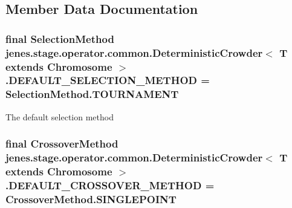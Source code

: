 \subsection{Member Data Documentation}
\hypertarget{classjenes_1_1stage_1_1operator_1_1common_1_1_deterministic_crowder_3_01_t_01extends_01_chromosome_01_4_5ca3f3abce0f3163383ed9158b154289}{
\subsubsection[DEFAULT\_\-SELECTION\_\-METHOD]{\setlength{\rightskip}{0pt plus 5cm}final {\bf SelectionMethod} jenes.stage.operator.common.DeterministicCrowder$<$ T extends Chromosome $>$.{\bf DEFAULT\_\-SELECTION\_\-METHOD} = SelectionMethod.TOURNAMENT}}
\label{classjenes_1_1stage_1_1operator_1_1common_1_1_deterministic_crowder_3_01_t_01extends_01_chromosome_01_4_5ca3f3abce0f3163383ed9158b154289}


The default selection method \hypertarget{classjenes_1_1stage_1_1operator_1_1common_1_1_deterministic_crowder_3_01_t_01extends_01_chromosome_01_4_a09cba6e344d7681789f11213d6cccd0}{
\subsubsection[DEFAULT\_\-CROSSOVER\_\-METHOD]{\setlength{\rightskip}{0pt plus 5cm}final {\bf CrossoverMethod} jenes.stage.operator.common.DeterministicCrowder$<$ T extends Chromosome $>$.{\bf DEFAULT\_\-CROSSOVER\_\-METHOD} = CrossoverMethod.SINGLEPOINT}}
\label{classjenes_1_1stage_1_1operator_1_1common_1_1_deterministic_crowder_3_01_t_01extends_01_chromosome_01_4_a09cba6e344d7681789f11213d6cccd0}


